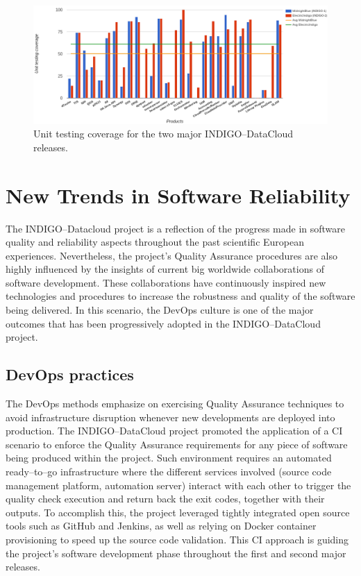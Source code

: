 \documentclass[journal]{IEEEtran}
\begin{document}
\begin{figure}
\centering
\includegraphics[width=\textwidth]{images/unittest.png}
\caption{Unit testing coverage for the two major INDIGO--DataCloud releases.}
\label{fig:fig_unittest}
\end{figure}

\section{New Trends in Software Reliability}

The INDIGO--Datacloud project is a reflection of the progress made in software
quality and reliability aspects throughout the past scientific European
experiences. Nevertheless, the project’s Quality Assurance procedures are also
highly influenced by the insights of current big worldwide collaborations of
software development. These collaborations have continuously inspired new
technologies and procedures to increase the robustness and quality of the
software being delivered. In this scenario, the DevOps culture is one of the
major outcomes that has been progressively adopted in the INDIGO--DataCloud
project.

\subsection{DevOps practices}

The DevOps methods emphasize on exercising Quality Assurance techniques to
avoid infrastructure disruption whenever new developments are deployed into
production. The INDIGO--DataCloud project promoted the application of a CI
scenario to enforce the Quality Assurance requirements for any piece of
software being produced within the project. Such environment requires an
automated ready--to--go infrastructure where the different services involved
(source code management platform, automation server) interact with each other
to trigger the quality check execution and return back the exit codes, together
with their outputs. To accomplish this, the project leveraged tightly
integrated open source tools such as GitHub and Jenkins, as well as relying on
Docker container provisioning to speed up the source code validation. This CI
approach is guiding the project’s software development phase throughout the
first and second major releases.
\end{document}

